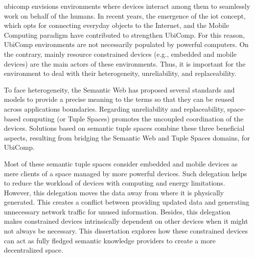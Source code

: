 




\begin{abstracts}        %
\acf{ubicomp} envisions environments where devices interact among them to seamlessly work on behalf of the humans.
In recent years, the emergence of the \acf{iot} concept, which opts for connecting everyday objects to the Internet, and the Mobile Computing paradigm have contributed to strengthen UbiComp.
For this reason, UbiComp environments are not necessarily populated by powerful computers.
On the contrary, mainly resource constrained devices (e.g., embedded and mobile devices) are the main actors of these environments.
Thus, it is important for the environment to deal with their heterogeneity, unreliability, and replaceability.


To face heterogeneity, the Semantic Web has proposed several standards and models to provide a precise meaning to the terms so that they can be reused across applications boundaries.
Regarding unreliability and replaceability, space-based computing (or Tuple Spaces) promotes the uncoupled coordination of the devices.
Solutions based on semantic tuple spaces combine these three beneficial aspects, resulting from bridging the Semantic Web and Tuple Spaces domains, for UbiComp.

Most of these semantic tuple spaces consider embedded and mobile devices as mere clients of a space managed by more powerful devices.
Such delegation helps to reduce the workload of devices with computing and energy limitations.
However,  this delegation moves the data away from where it is physically generated.
This creates a conflict between providing updated data and generating unnecessary network traffic for unused information.
Besides, this delegation makes constrained devices intrinsically dependent on other devices when it might not always be necessary.
This dissertation explores how these constrained devices can act as fully fledged semantic knowledge providers to create a more decentralized space.


\end{abstracts}
